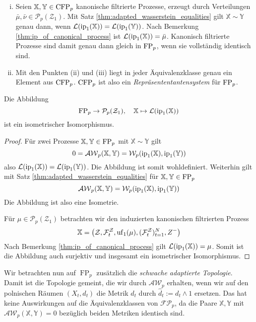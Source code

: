 \begin{remark}
\begin{enumerate}[(i)]
    \item Seien $\mathbb{X,Y}\in \operatorname{CFP}_p$ kanonische filtrierte Prozesse, erzeugt durch Verteilungen $\bar{\mu},\bar{\nu} \in \mathcal{P}_p(\mathcal{Z}_1)$. Mit Satz \ref{thm:adapted_wasserstein_equalities} gilt $\mathbb{X} \sim \mathbb{Y}$ genau dann, wenn $\mathcal{L}(\operatorname{ip}_1(\mathbb{X})) = \mathcal{L}(\operatorname{ip}_1(\mathbb{Y}))$. Nach Bemerkung \ref{thm:ip_of_canonical_process} ist $\mathcal{L}(\operatorname{ip}_1(\mathbb{X}))=\bar{\mu}$. Kanonisch filtrierte Prozesse sind damit genau dann gleich in $\operatorname{FP}_p$, wenn sie vollständig identisch sind. 
    \item Mit den Punkten (ii) und (iii) liegt in jeder Äquivalenzklasse genau ein Element aus $\operatorname{CFP}_p$. $\operatorname{CFP}_p$ ist also ein \emph{Repräsententantensystem} für $\operatorname{FP}_p$.
\end{enumerate}
\end{remark}
\begin{lemma}\label{thm:isometric_fp_pz}
    Die Abbildung 
    $$\operatorname{FP}_p \rightarrow \mathcal{P}_p(\mathcal{Z}_1), \quad \mathbb{X} \mapsto \mathcal{L}(\operatorname{ip}_1(\mathbb{X}))$$
     ist ein isometrischer Isomorphismus.
\end{lemma}
\begin{proof}
    Für zwei Prozesse $\mathbb{X,Y} \in \operatorname{FP}_p$ mit $\mathbb{X}\sim \mathbb{Y}$ gilt 
    $$0=\mathcal{AW}_p(\mathbb{X}, \mathbb{Y}) = \mathcal{W}_p(\operatorname{ip}_1(\mathbb{X}), \operatorname{ip}_1(\mathbb{Y}))$$
    also $\mathcal{L}(\operatorname{ip}_1(\mathbb{X})) = \mathcal{L}(\operatorname{ip}_1(\mathbb{Y}))$. Die Abbildung ist somit wohldefiniert. Weiterhin gilt mit Satz \ref{thm:adapted_wasserstein_equalities} für $\mathbb{X,Y} \in \operatorname{FP}_p$
    $$\mathcal{AW}_p(\mathbb{X,Y}) = \mathcal{W}_p(\operatorname{ip}_1(\mathbb{X}), \operatorname{ip}_1(\mathbb{Y}))$$
    Die Abbildung ist also eine Isometrie. 

    Für $\mu \in \mathcal{P}_p(\mathcal{Z}_1)$ betrachten wir den induzierten kanonischen filtrierten Prozess
    $$\mathbb{X} = \left( \mathcal{Z}, \mathcal{F}_t^\mathcal{Z}, \operatorname{uf}_1(\mu), (\mathcal{F}_t^\mathcal{Z})_{t=1}^N, Z^-\right)$$
    Nach Bemerkung \ref{thm:ip_of_canonical_process} gilt $\mathcal{L}(\operatorname{ip}_1(\mathbb{X})) = \mu$. Somit ist die Abbildung auch surjektiv und insgesamt ein isometrischer Isomorphismus.
\end{proof}
Wir betrachten nun auf $\operatorname{FP}_p$ zusätzlich die \emph{schwache adaptierte Topologie}. Damit ist die Topologie gemeint, die wir durch $\mathcal{AW}_p$ erhalten, wenn wir auf den polnischen Räumen $(X_t, d_t)$ die Metrik $d_t$ durch $\widehat{d}_t := d_t \wedge 1$ ersetzen. Das hat keine Auswirkungen auf die Äquivalenzklassen von $\mathcal{FP}_p$, da die Paare $\mathbb{X,Y}$ mit $\mathcal{AW}_p(\mathbb{X,Y})=0$ bezüglich beiden Metriken identisch sind.

